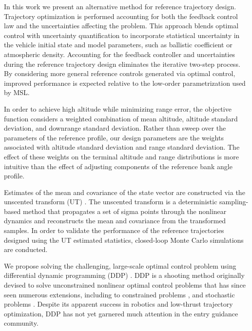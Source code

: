 \documentclass[journal ]{new-aiaa}
\begin{document}
In this work we present an alternative method for reference trajectory design. Trajectory optimization is performed accounting for both the feedback control law and the uncertainties affecting the problem. This approach blends optimal control with uncertainty quantification to incorporate statistical uncertainty in the vehicle initial state and model parameters, such as ballistic coefficient or atmospheric density. Accounting for the feedback controller and uncertainties during the reference trajectory design eliminates the iterative two-step process. By considering more general reference controls generated via optimal control, improved performance is expected relative to the low-order parametrization used by MSL.

In order to achieve high altitude while minimizing range error, the objective function considers a weighted combination of mean altitude, altitude standard deviation, and downrange standard deviation. Rather than sweep over the parameters of the reference profile, our design parameters are the weights associated with altitude standard deviation and range standard deviation. The effect of these weights on the terminal altitude and range distributions is more intuitive than the effect of adjusting components of the reference bank angle profile. 

Estimates of the mean and covariance of the state vector are constructed via the unscented transform (UT) \cite{UT1997}. The unscented transform is a deterministic sampling-based method that propagates a set of sigma points through the nonlinear dynamics and reconstructs the mean and covariance from the transformed samples. In order to validate the performance of the reference trajectories designed using the UT estimated statistics, closed-loop Monte Carlo simulations are conducted.

We propose solving the challenging, large-scale optimal control problem using differential dynamic programming (DDP) \cite{DDP}. DDP is a shooting method originally devised to solve unconstrained nonlinear optimal control problems that has since seen numerous extensions, including to constrained problems \cite{DDP_ControlLimited,HDDP1,HDDP2,DDP_NonlinearConstraints,DDP_InteriorPoint}, and stochastic problems \cite{iLQG, DDP_Stochastic, ozaki_UT,ozaki2020tube}. 
Despite its apparent success in robotics and low-thrust trajectory optimization, DDP has not yet garnered much attention in the entry guidance community. 
\end{document}
